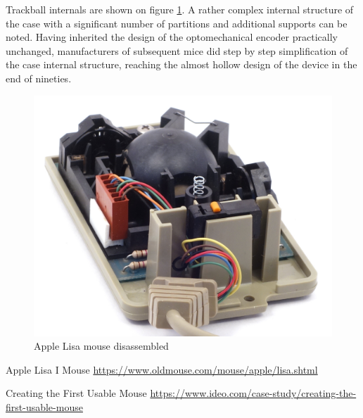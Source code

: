 \documentclass[11pt, a4paper]{article}
\begin{document}
Trackball internals are shown on figure \ref{fig:AppleLisaInside}. A rather complex internal structure of the case with a significant number of partitions and additional supports can be noted. Having inherited the design of the optomechanical encoder practically unchanged, manufacturers of subsequent mice did step by step simplification of the case internal structure, reaching the almost hollow design of the device in the end of nineties.

 \begin{figure}[h]
    \centering
    \includegraphics[scale=0.6]{1983_apple_lisa_mouse/appleraz_60.jpg}
    \caption{Apple Lisa mouse disassembled}
    \label{fig:AppleLisaInside}
\end{figure}

\begin{thebibliography}{9}
 Apple Lisa I Mouse \url{https://www.oldmouse.com/mouse/apple/lisa.shtml}

 Creating the First Usable Mouse \url{https://www.ideo.com/case-study/creating-the-first-usable-mouse}
\end{thebibliography}
\end{document}

